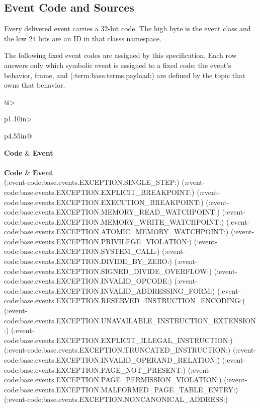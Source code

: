 \subsection{Event Code and Sources}\label{section:event-code-and-sources}
Every delivered event carries a 32-bit code. The high byte is the event class and the low 24 bits are an ID in that
class\textquotesingle{}s namespace.

\BedrockGeneratedEventCodeReference

The following fixed event codes are assigned by this specification. Each row answers only which symbolic event is
assigned to a fixed code; the event's behavior, frame, and (:term:base.terms.payload:) are defined by the topic that owns that behavior.

\begin{BedrockLongTable}{@{}>{\raggedright\arraybackslash}p{1.10in}>{\raggedright\arraybackslash}p{4.55in}@{}}
\toprule
{}
\textbf{Code} & \textbf{Event}\\
\midrule
\endfirsthead
{}\\
\toprule
{}
\textbf{Code} & \textbf{Event}\\
\midrule
\endhead
(:event-code:base.events.EXCEPTION.SINGLE_STEP:)
(:event-code:base.events.EXCEPTION.EXPLICIT_BREAKPOINT:)
(:event-code:base.events.EXCEPTION.EXECUTION_BREAKPOINT:)
(:event-code:base.events.EXCEPTION.MEMORY_READ_WATCHPOINT:)
(:event-code:base.events.EXCEPTION.MEMORY_WRITE_WATCHPOINT:)
(:event-code:base.events.EXCEPTION.ATOMIC_MEMORY_WATCHPOINT:)
(:event-code:base.events.EXCEPTION.PRIVILEGE_VIOLATION:)
(:event-code:base.events.EXCEPTION.SYSTEM_CALL:)
(:event-code:base.events.EXCEPTION.DIVIDE_BY_ZERO:)
(:event-code:base.events.EXCEPTION.SIGNED_DIVIDE_OVERFLOW:)
(:event-code:base.events.EXCEPTION.INVALID_OPCODE:)
(:event-code:base.events.EXCEPTION.INVALID_ADDRESSING_FORM:)
(:event-code:base.events.EXCEPTION.RESERVED_INSTRUCTION_ENCODING:)
(:event-code:base.events.EXCEPTION.UNAVAILABLE_INSTRUCTION_EXTENSION:)
(:event-code:base.events.EXCEPTION.EXPLICIT_ILLEGAL_INSTRUCTION:)
(:event-code:base.events.EXCEPTION.TRUNCATED_INSTRUCTION:)
(:event-code:base.events.EXCEPTION.INVALID_OPERAND_RELATION:)
(:event-code:base.events.EXCEPTION.PAGE_NOT_PRESENT:)
(:event-code:base.events.EXCEPTION.PAGE_PERMISSION_VIOLATION:)
(:event-code:base.events.EXCEPTION.MALFORMED_PAGE_TABLE_ENTRY:)
(:event-code:base.events.EXCEPTION.NONCANONICAL_ADDRESS:)

\end{BedrockLongTable}
